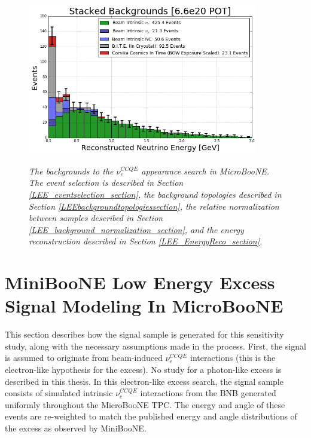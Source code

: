 \begin{figure}[ht!]
\centering
\includegraphics[width=0.9\textwidth]{Figures/LEE_stackedbackgrounds_nosignal_withAnalysisCuts.png}\\
\caption{\textit{The backgrounds to the $\nu_e^{CCQE}$ appearance search in MicroBooNE. The event selection is described in Section \ref{LEE_eventselection_section}, the background topologies described in Section \ref{LEEbackgroundtopologiessection}, the relative normalization between samples described in Section \ref{LEE_background_normalization_section}, and the energy reconstruction described in Section \ref{LEE_EnergyReco_section}.}}
\label{LEE_stackedbackgrounds_nosignal_withanalysiscuts_fig}
\end{figure}





\section{MiniBooNE Low Energy Excess Signal Modeling In MicroBooNE}\label{MBLEESignalModeling_section}
This section describes how the signal sample is generated for this sensitivity study, along with the necessary assumptions made in the process. First, the signal is assumed to originate from beam-induced $\nu_e^{CCQE}$ interactions (this is the electron-like hypothesis for the excess). No study for a photon-like excess is described in this thesis. In this electron-like excess search, the signal sample consists of simulated intrinsic $\nu_e^{CCQE}$ interactions from the BNB generated uniformly throughout the MicroBooNE TPC. The energy and angle of these events are re-weighted to match the published energy and angle distributions of the excess as observed by MiniBooNE. \\


